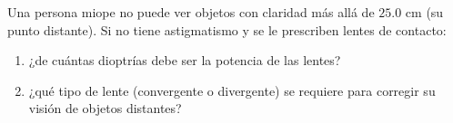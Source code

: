 \item Una persona miope no puede ver objetos con claridad más allá de $25.0\text{ cm}$ (su punto distante). Si no tiene astigmatismo y se le prescriben lentes de contacto:
\begin{enumerate}
    \item ¿de cuántas dioptrías debe ser la potencia de las lentes?
    \item ¿qué tipo de lente (convergente o divergente) se requiere para corregir su visión de objetos distantes?
\end{enumerate}